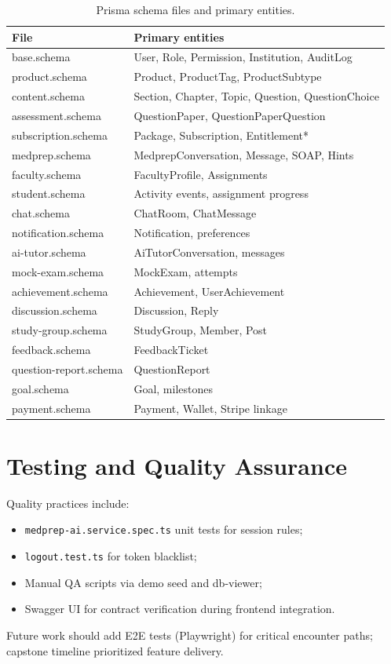 \begin{table}[htbp]
  \centering
  \caption{Prisma schema files and primary entities.}
  \label{tab:schema-files}
  \footnotesize
  \begin{tabular}{@{}p{3.8cm}p{9.4cm}@{}}
    \toprule
    \textbf{File} & \textbf{Primary entities} \\
    \midrule
    base.schema & User, Role, Permission, Institution, AuditLog \\
    product.schema & Product, ProductTag, ProductSubtype \\
    content.schema & Section, Chapter, Topic, Question, QuestionChoice \\
    assessment.schema & QuestionPaper, QuestionPaperQuestion \\
    subscription.schema & Package, Subscription, Entitlement* \\
    medprep.schema & MedprepConversation, Message, SOAP, Hints \\
    faculty.schema & FacultyProfile, Assignments \\
    student.schema & Activity events, assignment progress \\
    chat.schema & ChatRoom, ChatMessage \\
    notification.schema & Notification, preferences \\
    ai-tutor.schema & AiTutorConversation, messages \\
    mock-exam.schema & MockExam, attempts \\
    achievement.schema & Achievement, UserAchievement \\
    discussion.schema & Discussion, Reply \\
    study-group.schema & StudyGroup, Member, Post \\
    feedback.schema & FeedbackTicket \\
    question-report.schema & QuestionReport \\
    goal.schema & Goal, milestones \\
    payment.schema & Payment, Wallet, Stripe linkage \\
    \bottomrule
  \end{tabular}
\end{table}

\section{Testing and Quality Assurance}
Quality practices include:
\begin{itemize}
  \item \texttt{medprep-ai.service.spec.ts} unit tests for session rules;
  \item \texttt{logout.test.ts} for token blacklist;
  \item Manual QA scripts via demo seed and db-viewer;
  \item Swagger UI for contract verification during frontend integration.
\end{itemize}

Future work should add E2E tests (Playwright) for critical encounter paths; capstone timeline prioritized feature delivery.
